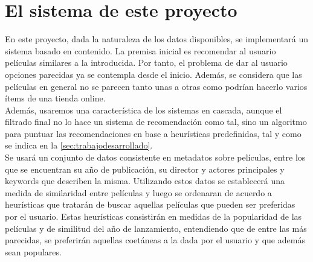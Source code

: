 \section{El sistema de este proyecto}

En este proyecto, dada la naturaleza de los datos disponibles, se implementará un sistema basado en contenido. La premisa inicial es recomendar al usuario películas similares a la introducida. Por tanto, el problema de dar al usuario opciones parecidas ya se contempla desde el inicio. Además, se considera que las películas en general no se parecen tanto unas a otras como podrían hacerlo varios ítems de una tienda online.\\

Además, usaremos una característica de los sistemas en cascada, aunque el filtrado final no lo hace un sistema de recomendación como tal, sino un algoritmo para puntuar las recomendaciones en base a heurísticas predefinidas, tal y como se indica en la \autoref{sec:trabajodesarrollado}.\\

Se usará un conjunto de datos consistente en metadatos sobre películas, entre los que se encuentran su año de publicación, su director y actores principales y keywords que describen la misma. Utilizando estos datos se establecerá una medida de similaridad entre películas y luego se ordenaran de acuerdo a heurísticas que tratarán de buscar aquellas películas que pueden ser preferidas por el usuario. Estas heurísticas consistirán en medidas de la popularidad de las películas y de similitud del año de lanzamiento, entendiendo que de entre las más parecidas, se preferirán aquellas coetáneas a la dada por el usuario y que además sean populares.


